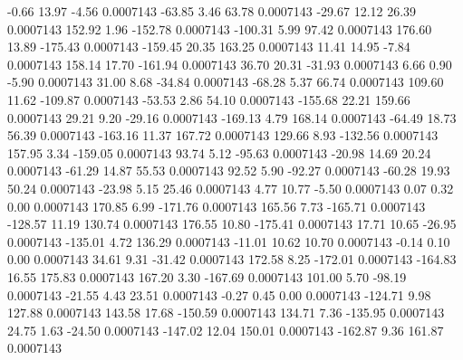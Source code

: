        -0.66       13.97       -4.56     0.0007143
      -63.85        3.46       63.78     0.0007143
      -29.67       12.12       26.39     0.0007143
      152.92        1.96     -152.78     0.0007143
     -100.31        5.99       97.42     0.0007143
      176.60       13.89     -175.43     0.0007143
     -159.45       20.35      163.25     0.0007143
       11.41       14.95       -7.84     0.0007143
      158.14       17.70     -161.94     0.0007143
       36.70       20.31      -31.93     0.0007143
        6.66        0.90       -5.90     0.0007143
       31.00        8.68      -34.84     0.0007143
      -68.28        5.37       66.74     0.0007143
      109.60       11.62     -109.87     0.0007143
      -53.53        2.86       54.10     0.0007143
     -155.68       22.21      159.66     0.0007143
       29.21        9.20      -29.16     0.0007143
     -169.13        4.79      168.14     0.0007143
      -64.49       18.73       56.39     0.0007143
     -163.16       11.37      167.72     0.0007143
      129.66        8.93     -132.56     0.0007143
      157.95        3.34     -159.05     0.0007143
       93.74        5.12      -95.63     0.0007143
      -20.98       14.69       20.24     0.0007143
      -61.29       14.87       55.53     0.0007143
       92.52        5.90      -92.27     0.0007143
      -60.28       19.93       50.24     0.0007143
      -23.98        5.15       25.46     0.0007143
        4.77       10.77       -5.50     0.0007143
        0.07        0.32        0.00     0.0007143
      170.85        6.99     -171.76     0.0007143
      165.56        7.73     -165.71     0.0007143
     -128.57       11.19      130.74     0.0007143
      176.55       10.80     -175.41     0.0007143
       17.71       10.65      -26.95     0.0007143
     -135.01        4.72      136.29     0.0007143
      -11.01       10.62       10.70     0.0007143
       -0.14        0.10        0.00     0.0007143
       34.61        9.31      -31.42     0.0007143
      172.58        8.25     -172.01     0.0007143
     -164.83       16.55      175.83     0.0007143
      167.20        3.30     -167.69     0.0007143
      101.00        5.70      -98.19     0.0007143
      -21.55        4.43       23.51     0.0007143
       -0.27        0.45        0.00     0.0007143
     -124.71        9.98      127.88     0.0007143
      143.58       17.68     -150.59     0.0007143
      134.71        7.36     -135.95     0.0007143
       24.75        1.63      -24.50     0.0007143
     -147.02       12.04      150.01     0.0007143
     -162.87        9.36      161.87     0.0007143
